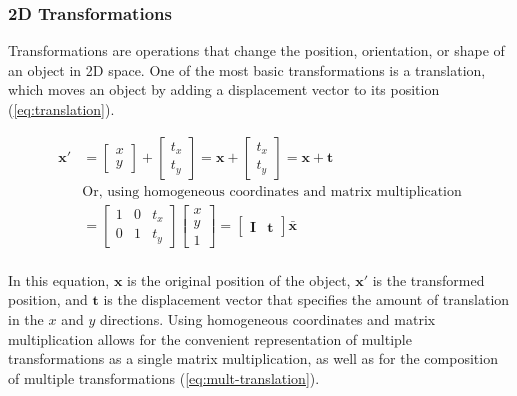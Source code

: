 \subsubsection{2D Transformations}
\label{sec:2d-transformations}
Transformations are operations that change the position, orientation, or shape of an object in 2D space. One of the most basic transformations is a translation, which moves an object by adding a displacement vector to its position (\cref{eq:translation}).

\begin{equation}
    \begin{aligned}
        \mathbf{x'} &= \begin{bmatrix}
            x  \\ y 
        \end{bmatrix} + \begin{bmatrix}
            t_x \\ t_y
        \end{bmatrix} = \mathbf{x} + \begin{bmatrix}
            t_x \\ t_y
        \end{bmatrix} = \mathbf{x} + \mathbf{t}\\
        &\text{Or, using homogeneous coordinates and matrix multiplication} \\
        &= \begin{bmatrix}
            1 & 0 & t_x \\ 0 & 1 & t_y
        \end{bmatrix} \begin{bmatrix}
            x \\ y \\ 1
        \end{bmatrix} = \begin{bmatrix}
            \mathbf{I} & \mathbf{t}
        \end{bmatrix}\bar{\mathbf{x}} \\
    \end{aligned}
    \label{eq:translation}
\end{equation}

In this equation, $\mathbf{x}$ is the original position of the object, $\mathbf{x'}$ is the transformed position, and $\mathbf{t}$ is the displacement vector that specifies the amount of translation in the $x$ and $y$ directions. Using homogeneous coordinates and matrix multiplication allows for the convenient representation of multiple transformations as a single matrix multiplication, as well as for the composition of multiple transformations (\cref{eq:mult-translation}). 

